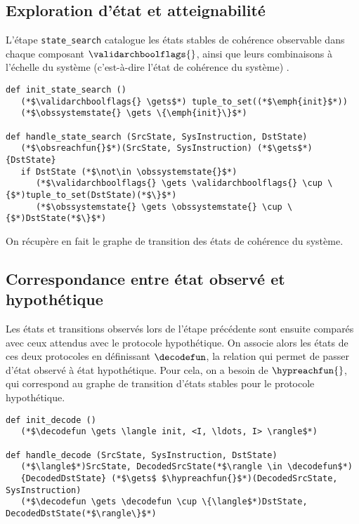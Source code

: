 \subsection{Exploration d'état et atteignabilité}
L'étape \lstinline!state_search! catalogue les états stables de cohérence
observable dans chaque composant $\validarchboolflags{}$, ainsi que leurs
combinaisons à l'échelle du système (c'est-à-dire l'état de cohérence du
système) \obssystemstate{}.

\begin{lstlisting}
def init_state_search ()
   (*$\validarchboolflags{} \gets$*) tuple_to_set((*$\emph{init}$*))
   (*$\obssystemstate{} \gets \{\emph{init}\}$*)

def handle_state_search (SrcState, SysInstruction, DstState)
   (*$\obsreachfun{}$*)(SrcState, SysInstruction) (*$\gets$*) {DstState}
   if DstState (*$\not\in \obssystemstate{}$*)
      (*$\validarchboolflags{} \gets \validarchboolflags{} \cup \{$*)tuple_to_set(DstState)(*$\}$*)
      (*$\obssystemstate{} \gets \obssystemstate{} \cup \{$*)DstState(*$\}$*)
\end{lstlisting}

On récupère en fait le graphe de transition des états de cohérence du système.


\subsection{Correspondance entre état observé et hypothétique}
Les états et transitions observés lors de l'étape précédente sont
ensuite comparés avec ceux attendus avec le protocole hypothétique. On
associe alors les états de ces deux protocoles en définissant
$\decodefun$, la relation qui permet de passer d'état observé à état
hypothétique. Pour cela, on a besoin de $\hypreachfun{}$, qui
correspond au graphe de transition d'états stables pour le protocole
hypothétique.

\begin{lstlisting}
def init_decode ()
   (*$\decodefun \gets \langle init, <I, \ldots, I> \rangle$*)

def handle_decode (SrcState, SysInstruction, DstState)
   (*$\langle$*)SrcState, DecodedSrcState(*$\rangle \in \decodefun$*)
   {DecodedDstState} (*$\gets$ $\hypreachfun{}$*)(DecodedSrcState, SysInstruction)
   (*$\decodefun \gets \decodefun \cup \{\langle$*)DstState, DecodedDstState(*$\rangle\}$*)
\end{lstlisting}

